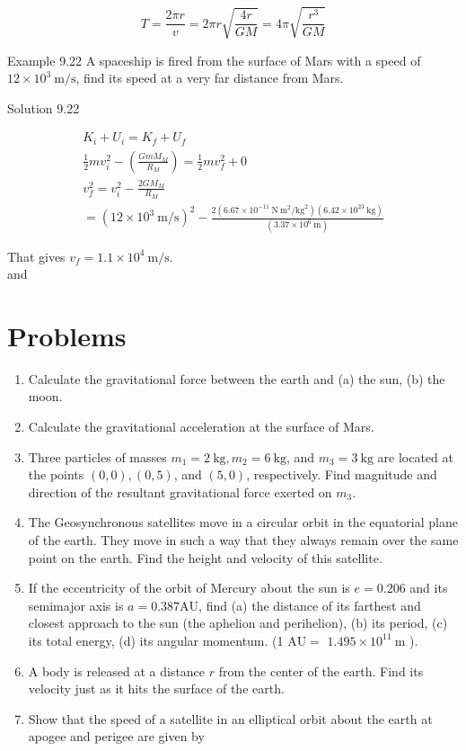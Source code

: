 \documentclass[10pt]{article}
\begin{document}
$$
T=\frac{2 \pi r}{v}=2 \pi r \sqrt{\frac{4 r}{G M}}=4 \pi \sqrt{\frac{r^{3}}{G M}}
$$

Example 9.22 A spaceship is fired from the surface of Mars with a speed of $12 \times 10^{3} \mathrm{~m} / \mathrm{s}$, find its speed at a very far distance from Mars.

Solution 9.22

$$
\begin{gathered}
K_{i}+U_{i}=K_{f}+U_{f} \\
\frac{1}{2} m v_{i}^{2}-\left(\frac{G m M_{M}}{R_{M}}\right)=\frac{1}{2} m v_{f}^{2}+0 \\
v_{f}^{2}=v_{i}^{2}-\frac{2 G M_{M}}{R_{M}} \\
=\left(12 \times 10^{3} \mathrm{~m} / \mathrm{s}\right)^{2}-\frac{2\left(6.67 \times 10^{-11} \mathrm{~N} \mathrm{~m}^{2} / \mathrm{kg}^{2}\right)\left(6.42 \times 10^{23} \mathrm{~kg}\right)}{\left(3.37 \times 10^{6} \mathrm{~m}\right)}
\end{gathered}
$$

That gives $v_{f}=1.1 \times 10^{4} \mathrm{~m} / \mathrm{s}$.\\
and

\section*{Problems}
\begin{enumerate}
  \item Calculate the gravitational force between the earth and (a) the sun, (b) the moon.
  \item Calculate the gravitational acceleration at the surface of Mars.
  \item Three particles of masses $m_{1}=2 \mathrm{~kg}, m_{2}=6 \mathrm{~kg}$, and $m_{3}=3 \mathrm{~kg}$ are located at the points $(0,0),(0,5)$, and $(5,0)$, respectively. Find magnitude and direction of the resultant gravitational force exerted on $m_{3}$.
  \item The Geosynchronous satellites move in a circular orbit in the equatorial plane of the earth. They move in such a way that they always remain over the same point on the earth. Find the height and velocity of this satellite.
  \item If the eccentricity of the orbit of Mercury about the sun is $e=0.206$ and its semimajor axis is $a=0.387 \mathrm{AU}$, find (a) the distance of its farthest and closest approach to the sun (the aphelion and perihelion), (b) its period, (c) its total energy, (d) its angular momentum. (1 $\mathrm{AU}=$ $1.495 \times 10^{11} \mathrm{~m}$ ).
  \item A body is released at a distance $r$ from the center of the earth. Find its velocity just as it hits the surface of the earth.
  \item Show that the speed of a satellite in an elliptical orbit about the earth at apogee and perigee are given by
\end{enumerate}
\end{document}
